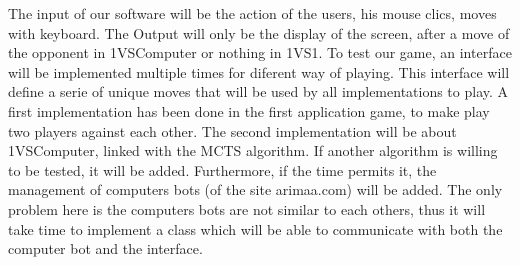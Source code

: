 The input of our software will be the action of the users, his mouse clics, moves with keyboard. The Output will only be the display of the screen, after a move of the opponent in 1VSComputer or nothing in 1VS1.
\smallbreak
To test our game, an interface will be implemented multiple times for diferent way of playing. This interface will define a serie of unique moves that will be used by all implementations to play. A first implementation has been done in the first application game, to make play two players against each other. The second implementation will be about 1VSComputer, linked with the MCTS algorithm. If another algorithm is willing to be tested, it will be added.
\smallbreak
Furthermore, if the time permits it, the management of computers bots (of the site arimaa.com) will be added. The only problem here is the computers bots are not similar to each others, thus it will take time to implement a class which will be able to communicate with both the computer bot and the interface.